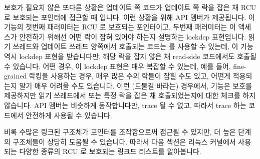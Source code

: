 보호가 필요치 않은 또다른 상황은 업데이트 쪽 코드가 업데이트 쪽 락을 잡은 채
RCU 로 보호되는 포인터에 접근할 때 입니다.
이런 상황을 위해  API 멤버가 제공됩니다.
이 기능의 첫번째 패러미터는 RCU 로 보호되는 포인터이고, 두번째 패러미터는 이
액세스가 안전하기 위해선 어떤 락이 잡혀 있어야 하는지 설명하는 lockdep
표현입니다.
읽기 쓰레드와 업데이트 쓰레드 양쪽에서 호출되는 코드는
 를 사용할 수 있는데, 이 기능 역시 lockdep 표현을
받습니다만, 해당 락을 잡지 않은 채 read-side 코드에서도 호출될 수 있습니다.
어떤 경우, 이 lockdep 표현은 매우 복잡할 수 있는데, 예를 들어, fine-grained
락킹을 사용하는 경우, 매우 많은 수의 락들이 잡힐 수도 있고, 어떤게 적용되는지
알기 매우 어려울 수도 있습니다.
이런 (드물길 바라는) 경우에서,  기능은 보호를
제공하지만 읽기 쓰레드에서 또는 특정 락을 잡은 채 호출되었는지에 대한 체크를
하지 않습니다.
 API 멤버는 비슷하게 동작합니다만, trace 될
수 없고, 따라서 trace 하는 코드에서 안전하게 사용될 수 있습니다.

비록 수많은 링크된 구조체가 포인터를 조작함으로써 접근될 수 있지만, 더 높은
단계의 구조체들이 상당히 도움될 수 있습니다.
따라서 다음 섹션은 리눅스 커널에서 사용되는 다양한 종류의 RCU 로 보호되는
링크드 리스트를 알아봅니다.

